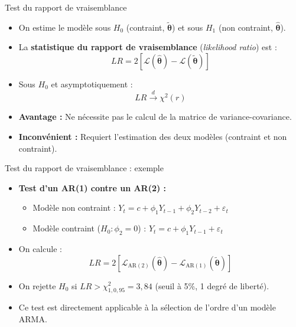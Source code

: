 \documentclass[11pt,aspectratio=169]{beamer}
\begin{document}
\begin{frame}{Test du rapport de vraisemblance}

\begin{itemize}

\item On estime le modèle sous $H_0$ (contraint, $\tilde{\bm{\theta}}$) et sous $H_1$ (non contraint, $\hat{\bm{\theta}}$).\newline

\item La \textbf{statistique du rapport de vraisemblance} (\emph{likelihood ratio}) est :
  \[
  LR = 2\left[\mathcal{L}(\hat{\bm{\theta}}) - \mathcal{L}(\tilde{\bm{\theta}})\right]
  \]\newline

\item Sous $H_0$ et asymptotiquement :
  \[
  LR \xrightarrow{d} \chi^2(r)
  \]\newline

\item \textbf{Avantage :} Ne nécessite pas le calcul de la matrice de variance-covariance.\newline

\item \textbf{Inconvénient :} Requiert l'estimation des deux modèles (contraint et non contraint).

\end{itemize}

\end{frame}

\begin{frame}{Test du rapport de vraisemblance : exemple}

\begin{itemize}

\item \textbf{Test d'un AR(1) contre un AR(2) :}
  \begin{itemize}
  \item Modèle non contraint : $Y_t = c + \phi_1 Y_{t-1} + \phi_2 Y_{t-2} + \varepsilon_t$
  \item Modèle contraint ($H_0 : \phi_2 = 0$) : $Y_t = c + \phi_1 Y_{t-1} + \varepsilon_t$
  \end{itemize}

\item On calcule :
  \[
  LR = 2\left[\mathcal{L}_{\text{AR}(2)}(\hat{\bm{\theta}}) - \mathcal{L}_{\text{AR}(1)}(\tilde{\bm{\theta}})\right]
  \]\newline

\item On rejette $H_0$ si $LR > \chi^2_{1, 0{,}95} = 3{,}84$ (seuil à 5\%, 1 degré de liberté).\newline

\item Ce test est directement applicable à la sélection de l'ordre d'un modèle ARMA.

\end{itemize}

\end{frame}
\end{document}
